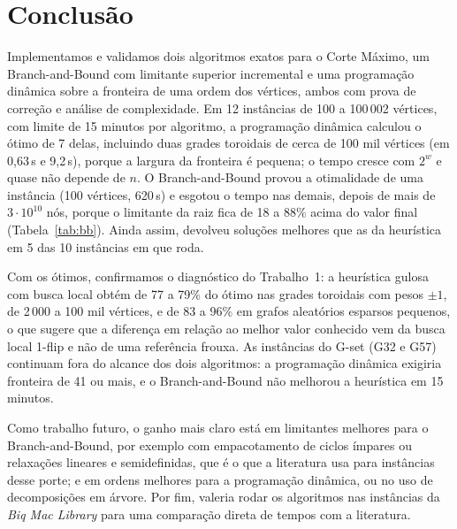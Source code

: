 \section{Conclusão}

Implementamos e validamos dois algoritmos exatos para o Corte Máximo, um Branch-and-Bound com limitante superior incremental e uma programação dinâmica sobre a fronteira de uma ordem dos vértices, ambos com prova de correção e análise de complexidade. Em 12 instâncias de 100 a 100\,002 vértices, com limite de 15 minutos por algoritmo, a programação dinâmica calculou o ótimo de 7 delas, incluindo duas grades toroidais de cerca de 100 mil vértices (em 0,63\,s e 9,2\,s), porque a largura da fronteira é pequena; o tempo cresce com $2^{w}$ e quase não depende de $n$. O Branch-and-Bound provou a otimalidade de uma instância (100 vértices, 620\,s) e esgotou o tempo nas demais, depois de mais de $3\cdot10^{10}$ nós, porque o limitante da raiz fica de 18 a 88\% acima do valor final (Tabela~\ref{tab:bb}). Ainda assim, devolveu soluções melhores que as da heurística em 5 das 10 instâncias em que roda.

Com os ótimos, confirmamos o diagnóstico do Trabalho~1: a heurística gulosa com busca local obtém de 77 a 79\% do ótimo nas grades toroidais com pesos $\pm1$, de 2\,000 a 100 mil vértices, e de 83 a 96\% em grafos aleatórios esparsos pequenos, o que sugere que a diferença em relação ao melhor valor conhecido vem da busca local 1-flip e não de uma referência frouxa. As instâncias do G-set (G32 e G57) continuam fora do alcance dos dois algoritmos: a programação dinâmica exigiria fronteira de 41 ou mais, e o Branch-and-Bound não melhorou a heurística em 15 minutos.

Como trabalho futuro, o ganho mais claro está em limitantes melhores para o Branch-and-Bound, por exemplo com empacotamento de ciclos ímpares ou relaxações lineares e semidefinidas, que é o que a literatura usa para instâncias desse porte; e em ordens melhores para a programação dinâmica, ou no uso de decomposições em árvore. Por fim, valeria rodar os algoritmos nas instâncias da \emph{Biq Mac Library} para uma comparação direta de tempos com a literatura.
